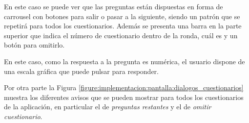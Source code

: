                 En este caso se puede ver que las preguntas están dispuestas en forma de carrousel con botones para salir o pasar a la siguiente, siendo un patrón que se repetirá para todos los cuestionarios. Además se presenta una barra en la parte superior que indica el número de cuestionario dentro de la ronda, cuál es y un botón para omitirlo.

                En este caso, como la respuesta a la pregunta es numérica, el usuario dispone de una escala gráfica que puede pulsar para responder.

                Por otra parte la Figura \ref{figure:implementacion:pantalla:dialogos_cuestionarios} muestra los diferentes avisos que se pueden mostrar para todos los cuestionarios de la aplicación, en particular el de \textit{preguntas restantes} y el de \textit{omitir cuestionario}.
                
